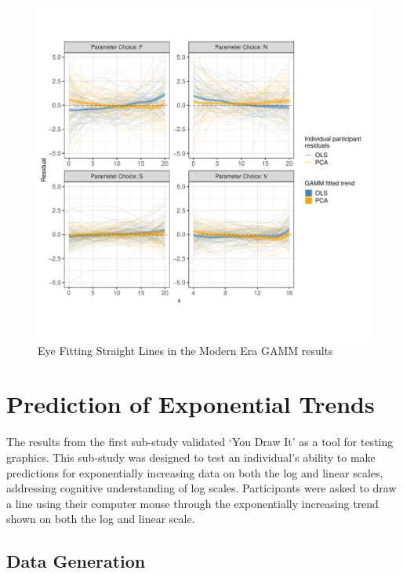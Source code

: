 \documentclass[print]{nuthesis}
\begin{document}
\begin{figure}[tbp]

{\centering \includegraphics[width=1\linewidth,]{thesis_files/figure-latex/eyefitting-gamm-residualplots-1} 

}

\caption{Eye Fitting Straight Lines in the Modern Era GAMM results}\label{fig:eyefitting-gamm-residualplots}
\end{figure}

\hypertarget{prediction-of-exponential-trends}{%
\section{Prediction of Exponential Trends}\label{prediction-of-exponential-trends}}

The results from the first sub-study validated `You Draw It' as a tool for testing graphics.
This sub-study was designed to test an individual's ability to make predictions for exponentially increasing data on both the log and linear scales, addressing cognitive understanding of log scales.
Participants were asked to draw a line using their computer mouse through the exponentially increasing trend shown on both the log and linear scale.

\hypertarget{data-generation-2}{%
\subsection{Data Generation}\label{data-generation-2}}
\end{document}
